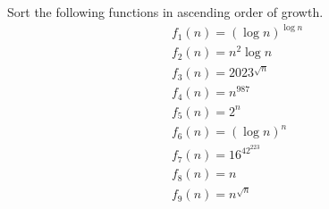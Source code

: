 \problem{}

Sort the following functions in ascending order of growth.
\begin{align}
    &f_1(n)=(\log{n})^{\log{n}} \\
    &f_2(n)=n^2\log{n} \\
    &f_3(n)=2023^{\sqrt{n}} \\
    &f_4(n)=n^{987}  \\
    &f_5(n)=2^{n} \\
    &f_6(n)=(\log{n})^{n}  \\
    &f_7(n)=16^{42^{223}}  \\
    &f_8(n)=n  \\
    &f_9(n)=n^{\sqrt{n}}
\end{align}

\solution{

}

\newpage